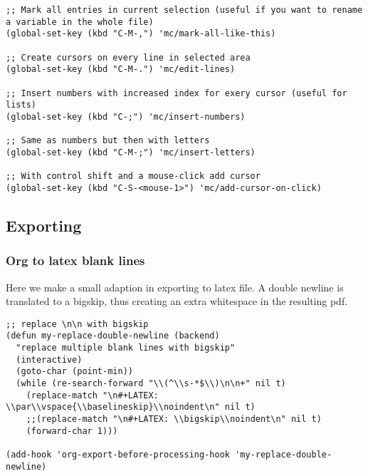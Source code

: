 \documentclass[11pt]{article}
\begin{document}
\begin{verbatim}
;; Mark all entries in current selection (useful if you want to rename a variable in the whole file)
(global-set-key (kbd "C-M-,") 'mc/mark-all-like-this)

;; Create cursors on every line in selected area
(global-set-key (kbd "C-M-.") 'mc/edit-lines)

;; Insert numbers with increased index for exery cursor (useful for lists)
(global-set-key (kbd "C-;") 'mc/insert-numbers)

;; Same as numbers but then with letters
(global-set-key (kbd "C-M-;") 'mc/insert-letters)

;; With control shift and a mouse-click add cursor
(global-set-key (kbd "C-S-<mouse-1>") 'mc/add-cursor-on-click)
\end{verbatim}
\subsection{Exporting}
\label{sec:org5ff0d99}
\subsubsection{Org to latex blank lines}
\label{sec:orgf4c99f5}
Here we make a small adaption in exporting to latex file. A double newline is translated to a bigskip, thus creating an extra whitespace in the resulting pdf.
\begin{verbatim}
;; replace \n\n with bigskip
(defun my-replace-double-newline (backend)
  "replace multiple blank lines with bigskip"
  (interactive)
  (goto-char (point-min))
  (while (re-search-forward "\\(^\\s-*$\\)\n\n+" nil t)
    (replace-match "\n#+LATEX: \\par\\vspace{\\baselineskip}\\noindent\n" nil t)
    ;;(replace-match "\n#+LATEX: \\bigskip\\noindent\n" nil t)
    (forward-char 1)))

(add-hook 'org-export-before-processing-hook 'my-replace-double-newline)
\end{verbatim}
\end{document}
